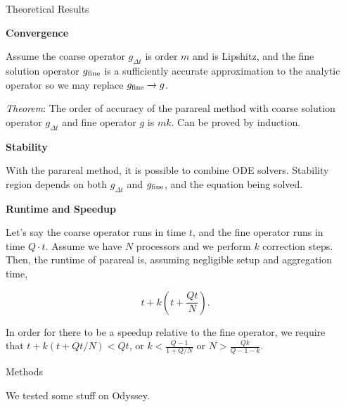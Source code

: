 \documentclass[final]{beamer}
\newlength{\sepwid}
\newlength{\onecolwid}
\begin{document}
\begin{frame}[t]
\begin{columns}[t]
\begin{column}{\onecolwid}

\begin{block}{Theoretical Results}

\textbf{Convergence}

Assume the coarse operator $g_{\Delta t}$ is order $m$ and is Lipshitz, and the
fine solution operator $g_{\textnormal{fine}}$ is a sufficiently accurate
approximation to the analytic operator so we may replace $g_{\textnormal{fine}}
\to g$. 

\emph{Theorem}: The order of accuracy of the parareal method with coarse
solution operator $g_{\Delta t}$ and fine operator $g$ is $mk$. Can be proved by
induction. 

\textbf{Stability}

With the parareal method, it is possible to combine ODE solvers. Stability
region depends on both $g_{\Delta t}$ and $g_{\textnormal{fine}}$, and the
equation being solved. 

\textbf{Runtime and Speedup}

Let's say the coarse operator runs in time $t$, and the fine operator runs in
time $Q \cdot t$. Assume we have $N$ processors and we perform $k$ correction
steps. Then, the runtime of parareal is, assuming negligible setup and
aggregation time,

\begin{equation}
t + k(t + \frac{Qt}{N}).
\end{equation}

In order for there to be a speedup relative to the fine operator, we require
that $t + k(t + Qt/N) < Qt$, or $k < \frac{Q - 1}{1 + Q/N}$ or $N > \frac{Qk}{Q
- 1 - k}$. 

\end{block}

\begin{block}{Methods}

We tested some stuff on Odyssey.

\end{block}



\end{column} %

\begin{column}{\sepwid}\end{column}


\end{columns}
\end{frame}
\end{document}

